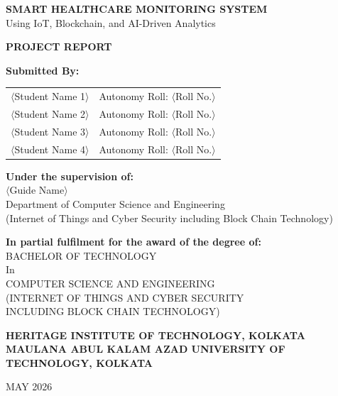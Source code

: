 \documentclass[12pt,a4paper]{report}
\begin{document}
\begin{titlepage}
\centering
\vspace*{2cm}

{\LARGE\bfseries SMART HEALTHCARE MONITORING SYSTEM\\[0.3cm]}
{\large Using IoT, Blockchain, and AI-Driven Analytics\\[1.5cm]}

{\Large\bfseries PROJECT REPORT\\[2cm]}

{\large\bfseries Submitted By:\\[0.5cm]}

\begin{tabular}{ll}
$\langle$Student Name 1$\rangle$ & Autonomy Roll: $\langle$Roll No.$\rangle$ \\
$\langle$Student Name 2$\rangle$ & Autonomy Roll: $\langle$Roll No.$\rangle$ \\
$\langle$Student Name 3$\rangle$ & Autonomy Roll: $\langle$Roll No.$\rangle$ \\
$\langle$Student Name 4$\rangle$ & Autonomy Roll: $\langle$Roll No.$\rangle$ \\
\end{tabular}

\vspace{1.5cm}
{\large\bfseries Under the supervision of:\\[0.3cm]}
{\large $\langle$Guide Name$\rangle$\\[0.2cm]}
{\normalsize Department of Computer Science and Engineering\\
(Internet of Things and Cyber Security including Block Chain Technology)\\[1.5cm]}

{\large\bfseries In partial fulfilment for the award of the degree of:\\[0.5cm]}
{\large BACHELOR OF TECHNOLOGY\\
In\\
COMPUTER SCIENCE AND ENGINEERING\\
(INTERNET OF THINGS AND CYBER SECURITY\\
INCLUDING BLOCK CHAIN TECHNOLOGY)\\[1cm]}

{\large\bfseries HERITAGE INSTITUTE OF TECHNOLOGY, KOLKATA\\[0.2cm]}
{\large\bfseries MAULANA ABUL KALAM AZAD UNIVERSITY OF TECHNOLOGY, KOLKATA\\[1.5cm]}

{\large MAY 2026}
\end{titlepage}
\end{document}
